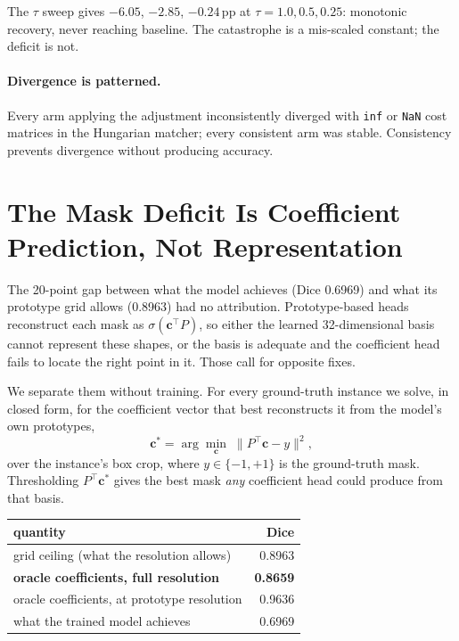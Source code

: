 \documentclass[10pt,twocolumn,letterpaper]{article}
\begin{document}
The $\tau$ sweep gives $-6.05$, $-2.85$, $-0.24$\,pp at $\tau=1.0,0.5,0.25$:
monotonic recovery, never reaching baseline. The catastrophe is a mis-scaled
constant; the deficit is not.

\paragraph{Divergence is patterned.} Every arm applying the adjustment
inconsistently diverged with \texttt{inf} or \texttt{NaN} cost matrices in the
Hungarian matcher; every consistent arm was stable. Consistency prevents
divergence without producing accuracy.



\section{The Mask Deficit Is Coefficient Prediction, Not Representation}

The 20-point gap between what the model achieves (Dice 0.6969) and what its
prototype grid allows (0.8963) had no attribution. Prototype-based heads
reconstruct each mask as $\sigma(\mathbf{c}^\top P)$, so either the learned
32-dimensional basis cannot represent these shapes, or the basis is adequate and
the coefficient head fails to locate the right point in it. Those call for
opposite fixes.

We separate them without training. For every ground-truth instance we solve, in
closed form, for the coefficient vector that best reconstructs it from the
model's own prototypes,
\begin{equation}
\mathbf{c}^{*} = \arg\min_{\mathbf{c}} \; \lVert P^{\top}\mathbf{c} - y \rVert^{2},
\end{equation}
over the instance's box crop, where $y\in\{-1,+1\}$ is the ground-truth mask.
Thresholding $P^{\top}\mathbf{c}^{*}$ gives the best mask \emph{any} coefficient
head could produce from that basis.

\begin{table}[h]
\centering\small
\begin{tabular}{lr}
\toprule
quantity & Dice \\
\midrule
grid ceiling (what the resolution allows) & 0.8963 \\
\textbf{oracle coefficients, full resolution} & \textbf{0.8659} \\
oracle coefficients, at prototype resolution & 0.9636 \\
what the trained model achieves & 0.6969 \\
\bottomrule
\end{tabular}
\end{table}
\end{document}
